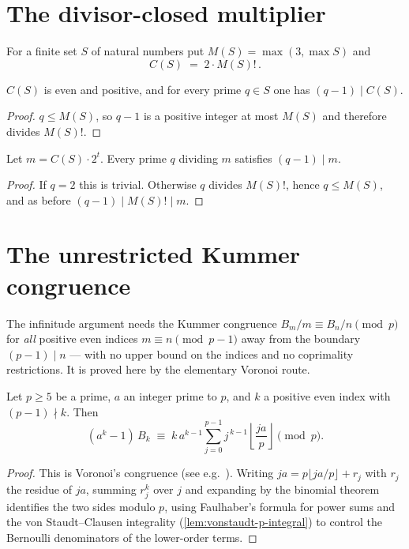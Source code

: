 \section{The divisor-closed multiplier}

\begin{definition}\label{def:irregular-base}
  \leanok
For a finite set $S$ of natural numbers put $M(S) = \max(3, \max S)$ and
\[
  C(S) \;=\; 2 \cdot M(S)! \,.
\]
\end{definition}

\begin{lemma}\label{lem:irregular-base-mem}
  \leanok
$C(S)$ is even and positive, and for every prime $q \in S$ one has
$(q-1)\mid C(S)$.
\end{lemma}
\begin{proof}\leanok
$q \le M(S)$, so $q - 1$ is a positive integer at most $M(S)$ and therefore
divides $M(S)!$.
\end{proof}

\begin{lemma}\label{lem:irregular-base-closed}
  \leanok
Let $m = C(S)\cdot 2^t$.  Every prime $q$ dividing $m$ satisfies
$(q-1)\mid m$.
\end{lemma}
\begin{proof}\leanok
If $q = 2$ this is trivial.  Otherwise $q$ divides $M(S)!$, hence
$q \le M(S)$, and as before $(q-1) \mid M(S)! \mid m$.
\end{proof}

\section{The unrestricted Kummer congruence}

The infinitude argument needs the Kummer congruence
$B_m/m \equiv B_n/n \pmod p$ for \emph{all} positive even indices
$m \equiv n \pmod{p-1}$ away from the boundary $(p-1)\mid n$ --- with no
upper bound on the indices and no coprimality restrictions.  It is proved
here by the elementary Voronoi route.

\begin{theorem}\label{thm:voronoi-congruence}
  \leanok
Let $p \ge 5$ be a prime, $a$ an integer prime to $p$, and $k$ a positive even
index with $(p-1)\nmid k$.  Then
\[
  (a^{k}-1)\,B_k \;\equiv\;
  k\,a^{k-1} \sum_{j=0}^{p-1} j^{\,k-1}\left\lfloor \frac{ja}{p}\right\rfloor
  \pmod{p}.
\]
\end{theorem}
\begin{proof}\leanok
This is Voronoi's congruence (see e.g.\ \cite[Chapter~15]{ireland-rosen}).
Writing $ja = p\lfloor ja/p \rfloor + r_j$
with $r_j$ the residue of $ja$, summing $r_j^k$ over $j$ and expanding by the
binomial theorem identifies the two sides modulo $p$, using Faulhaber's
formula for power sums and the von Staudt--Clausen integrality
(\cref{lem:vonstaudt-p-integral}) to control the Bernoulli denominators of
the lower-order terms.
\end{proof}

